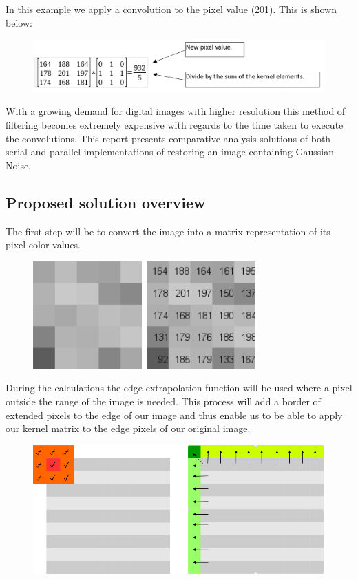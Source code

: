 \documentclass[paper=a4, fontsize=11pt]{scrartcl} %
\numberwithin{equation}{section} %
\numberwithin{figure}{section} %
\numberwithin{table}{section} %
\begin{document}
In this example we apply a convolution to the pixel value (201).
This is shown below:

\begin{figure}[H]
	\centering
	\includegraphics[scale=0.3]{"kernel example"}
        \label{kernel}
\end{figure}

With a growing demand for digital images with higher resolution this method of filtering becomes extremely expensive with regards to the time taken to execute the convolutions. This report presents comparative analysis solutions of both serial and parallel implementations of restoring an image containing Gaussian Noise.

\subsection{Proposed solution overview}
The first step will be to convert the image into a matrix representation of its pixel color values.

\begin{figure}[H]
	\centering
	\includegraphics[scale=0.5]{"greyscale2"}
        \label{greyscale2}
\end{figure}

During the calculations the edge extrapolation function will be used where a pixel outside the range of the image is needed. This process will add a border of extended pixels to the edge of our image and thus enable us to be able to apply our kernel matrix to the edge pixels of our original image.

\begin{figure}[H]
	\centering
	\includegraphics[scale=0.5]{"edge extrapolation"}
        \label{edge}
\end{figure}
\end{document}

